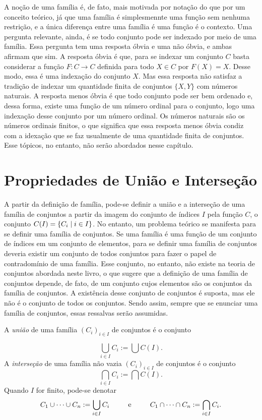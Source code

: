 A noção de uma família é, de fato, mais motivada por notação do que por um conceito teórico, já que uma família é simplesmennte uma função sem nenhuma restrição, e a única diferença entre uma família é uma função é o contexto. Uma pergunta relevante, ainda, é se todo conjunto pode ser indexado por meio de uma família. Essa pergunta tem uma resposta óbvia e uma não óbvia, e ambas afirmam que sim. A resposta óbvia é que, para se indexar um conjunto $C$ basta considerar a função $F: C \to C$ definida para todo $X \in C$ por $F(X)=X$. Desse modo, essa é uma indexação do conjunto $X$. Mas essa resposta não satisfaz a tradição de indexar um quantidade finita de conjuntos $\{X,Y\}$ com números naturais. A resposta menos óbvia é que todo conjunto pode ser bem ordenado e, dessa forma, existe uma função de um número ordinal para o conjunto, logo uma indexação desse conjunto por um número ordinal. Os números naturais são os números ordinais finitos, o que significa que essa resposta menos óbvia condiz com a idexação que se faz usualmente de uma quantidade finita de conjuntos. Esse tópicos, no entanto, não serão abordados nesse capítulo.

\section{Propriedades de União e Interseção}

A partir da definição de família, pode-se definir a união e a interseção de uma família de conjuntos a partir da imagem do conjunto de índices $I$ pela função $C$, o conjunto $C(I) = \left\{C_i \;\middle\vert\; i \in I \right\}$. No entanto, um problema teórico se manifesta para se definir uma família de conjuntos. Se uma família é uma função de um conjunto de índices em um conjunto de elementos, para se definir uma família de conjuntos deveria existir um conjunto de todos conjuntos para fazer o papel de contradomínio de uma família. Esse conjunto, no entanto, não existe na teoria de conjuntos abordada neste livro, o que sugere que a definição de uma família de conjuntos depende, de fato, de um conjunto cujos elementos são os conjuntos da família de conjuntos. A existência desse conjunto de conjuntos é suposta, mas ele não é o conjunto de todos os conjuntos. Sendo assim, sempre que se enunciar uma família de conjuntos, essas ressalvas serão assumidas.

\begin{defi}
A \emph{união} de uma família $(C_i)_{i \in I}$ de conjuntos é o conjunto
\end{defi}
	\begin{equation*}
	\bigcup_{i \in I} C_i := \bigcup C(I).
	\end{equation*}
A \emph{interseção} de uma família não vazia $(C_i)_{i \in I}$ de conjuntos é o conjunto
	\begin{equation*}
	\bigcap_{i \in I} C_i := \bigcap C(I).
	\end{equation*}
\noindent
Quando $I$ for finito, pode-se denotar
	\begin{equation*}
	C_1 \cup \cdots \cup C_n := \bigcup_{i \in I} C_i \qquad \text{\ \ e\ \ } \qquad C_1 \cap \cdots \cap C_n := \bigcap_{i \in I} C_i.
	\end{equation*}
	
